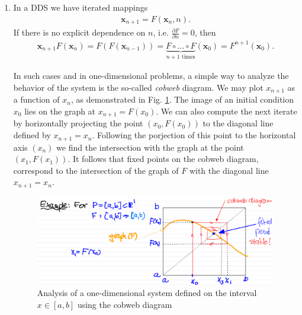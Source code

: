 \begin{enumerate}
	\item In a DDS we have iterated mappings 
	\begin{align}
		\boxed{ \textbf{x}_{n+1} = F( \textbf{x}_n , n).}	
	\end{align}
	If there is no explicit dependence on $n$, i.e. $\frac{\partial F}{\partial n} = 0$, then 
	\begin{align}
		\boxed{  \textbf{x}_{n+1} F( \textbf{x}_n) = F(F( \textbf{x}_{n-1})) = \underbrace{F \circ \ldots \circ F}_{n+1 \textrm{ times} }( \textbf{x}_0) = F^{n+1}( \textbf{x}_0).}
	\end{align}
\begin{ex}
	In such cases and in one-dimensional problems, a simple way to analyze the behavior of the system is the so-called \textit{cobweb} diagram. We may plot $x_{n+1}$ as a function of $x_{n}$, as demonstrated in Fig. \ref{fig:cobweb}. The image of an initial condition $x_0$ lies on the graph at $x_{n+1}=F(x_0)$. We can also compute the next iterate by horizontally projecting the point $(x_0, F(x_0))$ to the diagonal line defined by $x_{n+1}= x_n$. Following the porjection of this point to the horizontal axis $(x_n)$ we find the intersection with the graph at the point $(x_1, F(x_1))$. It follows that fixed points on the cobweb diagram, correspond to the intersection of the graph of $F$ with the diagonal line $x_{n+1}= x_n$.
	\begin{figure}[h!]
	\centering
	\includegraphics[width = \textwidth]{figures/intro/1DDS.png}
	\caption{Analysis of a one-dimensional system defined on the interval $x\in [a,b]$ using the cobweb diagram} \label{fig:cobweb}
\end{figure}
\end{ex}


\end{enumerate}
